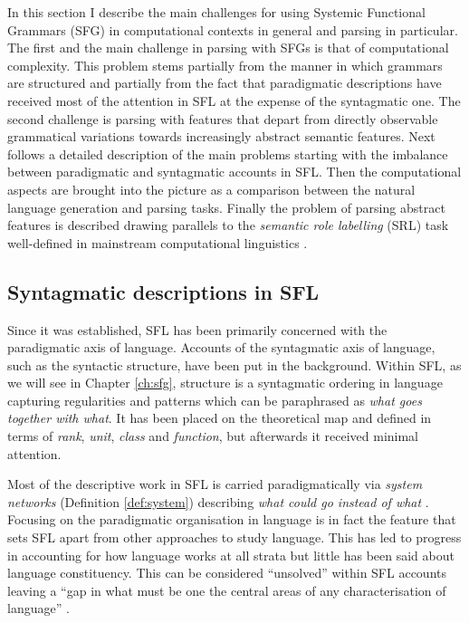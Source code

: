     In this section I describe the main challenges for using Systemic Functional Grammars (SFG) in computational contexts in general and parsing in particular. The first and the main challenge in parsing with SFGs is that of computational complexity. This problem stems partially from the manner in which grammars are structured and partially from the fact that paradigmatic descriptions have received most of the attention in SFL at the expense of the syntagmatic one. The second challenge is parsing with features that depart from directly observable grammatical variations towards increasingly abstract semantic features. 
    Next follows a detailed description of the main problems starting with the imbalance between paradigmatic and syntagmatic accounts in SFL. Then the computational aspects are brought into the picture as a comparison between the natural language generation and parsing tasks. Finally the problem of parsing abstract features is described drawing parallels to the \textit{semantic role labelling} (SRL) task well-defined in mainstream computational linguistics \citep{Carreras2005}. 

\subsection{Syntagmatic descriptions in SFL}

    Since it was established, SFL has been primarily concerned with the paradigmatic axis of language. Accounts of the syntagmatic axis of language, such as the syntactic structure, have been put in the background. Within SFL, as we will see in Chapter \ref{ch:sfg}, structure is a syntagmatic ordering in language capturing regularities and patterns which can be paraphrased as \textit{what goes together with what}. It has been placed on the theoretical map and defined in terms of \textit{rank}, \textit{unit}, \textit{class} and \textit{function}, but afterwards it received minimal attention.
    
    Most of the descriptive work in SFL is carried paradigmatically via \textit{system networks} (Definition \ref{def:system}) describing \textit{what could go instead of what} \citep[22]{Halliday2013}. Focusing on the paradigmatic organisation in language is in fact the feature that sets SFL apart from other approaches to study language. This has led to progress in accounting for how language works at all strata but little has been said about language constituency. This can be considered ``unsolved'' within SFL accounts leaving a ``gap in what must be one the central areas of any characterisation of language'' \citep[25]{Bateman2008}. 

